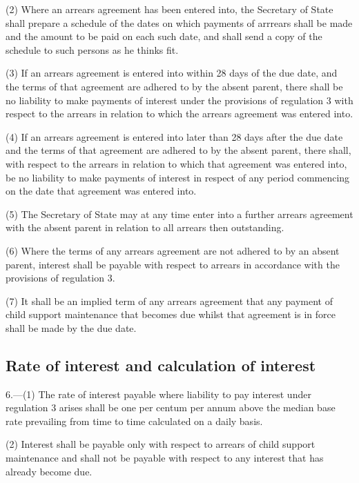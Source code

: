 \documentclass[12pt,a4paper]{article}
\begin{document}
(2) Where an arrears agreement has been entered into, the Secretary of State shall prepare a schedule of the dates on which payments of arrrears shall be made and the amount to be paid on each such date, and shall send a copy of the schedule to such persons as he thinks fit.

(3) If an arrears agreement is entered into within 28 days of the due date, and the terms of that agreement are adhered to by the absent parent, there shall be no liability to make payments of interest under the provisions of regulation 3 with respect to the arrears in relation to which the arrears agreement was entered into.

(4) If an arrears agreement is entered into later than 28 days after the due date and the terms of that agreement are adhered to by the absent parent, there shall, with respect to the arrears in relation to which that agreement was entered into, be no liability to make payments of interest in respect of any period commencing on the date that agreement was entered into.

(5) The Secretary of State may at any time enter into a further arrears agreement with the absent parent in relation to all arrears then outstanding.

(6) Where the terms of any arrears agreement are not adhered to by an absent parent, interest shall be payable with respect to arrears in accordance with the provisions of regulation 3.

(7) It shall be an implied term of any arrears agreement that any payment of child support maintenance that becomes due whilst that agreement is in force shall be made by the due date.


\subsection[6. Rate of interest and calculation of interest]{Rate of interest and calculation of interest}

6.—(1) The rate of interest payable where liability to pay interest under regulation 3 arises shall be one per centum per annum above the median base rate prevailing from time to time calculated on a daily basis.

(2) Interest shall be payable only with respect to arrears of child support maintenance and shall not be payable with respect to any interest that has already become due.
\end{document}
